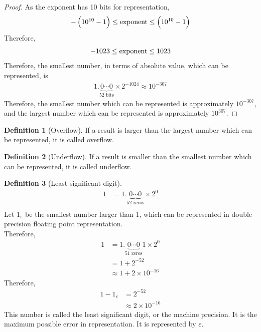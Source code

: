 \documentclass[fleqn, a4paper, 12pt, twoside, titlepage]{article}
\theoremstyle{definition}
\newtheorem{definition}{Definition}
\theoremstyle{theorem}
\begin{document}
\begin{proof}
	As the exponent has 10 bits for representation,
	\begin{equation*}
		-\left( 10^{10} - 1 \right) \le \textnormal{exponent} \le \left( 10^{10} - 1 \right)
	\end{equation*}
	Therefore,
	\begin{equation*}
		-1023 \le \textnormal{exponent} \le 1023
	\end{equation*}
	Therefore, the smallest number, in terms of absolute value, which can be represented, is
	\begin{align*}
		1.\underbrace{0 \cdots 0}_{\text{52 bits}} \times 2^{-1024} \approx 10^{-307}
	\end{align*}
	Therefore, the smallest number which can be represented is approximately $10^{-307}$, and the largest number which can be represented is approximately $10^{307}$.
\end{proof}

\begin{definition}[Overflow]
	If a result is larger than the largest number which can be represented, it is called overflow.
\end{definition}

\begin{definition}[Underflow]
	If a result is smaller than the smallest number which can be represented, it is called underflow.
\end{definition}

\begin{definition}[Least significant digit]
	\begin{align*}
		1 & = 1.\underbrace{0 \cdots 0}_{\text{52 zeros}} \times 2^0 \\
	\end{align*}
	Let $1_{\varepsilon}$ be the smallest number larger than 1, which can be represented in double precision floating point representation.\\
	Therefore,
	\begin{align*}
		1 & = 1.\underbrace{0 \cdots 0}_{\text{51 zeros}} 1 \times 2^0 \\
                  & = 1 + 2^{-52}                                              \\
                  & \approx 1 + 2 \times 10^{-16}
	\end{align*}
	Therefore,
	\begin{align*}
		1 - 1_{\varepsilon} & = 2^{-52} \\
                                    & \approx 2 \times 10^{-16}
	\end{align*}
	This number is called the least significant digit, or the machine precision.
	It is the maximum possible error in representation.
	It is represented by $\varepsilon$.
	\label{LSD}
\end{definition}
\end{document}
